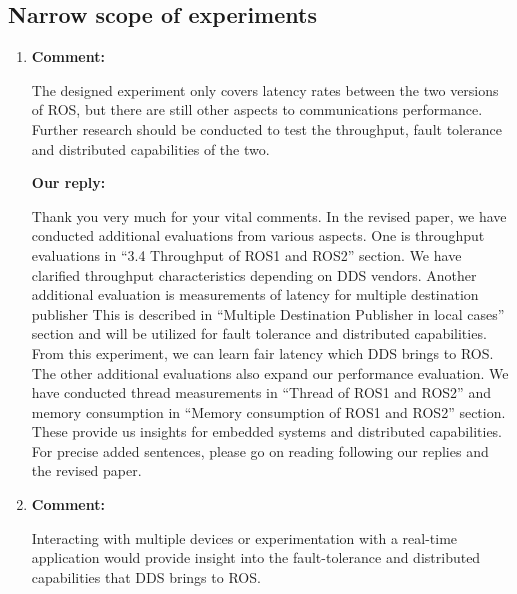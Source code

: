 \documentclass{article}
\begin{document}
\subsection{Narrow scope of experiments}
\begin{enumerate}

\item \begin{flushleft}
    \textbf{Comment:}
  \end{flushleft}
  The designed experiment only covers latency rates between the two versions of ROS, but there are still other aspects to communications performance. Further research should be conducted to test the throughput, fault tolerance and distributed capabilities of the two.
  
  \begin{flushleft}
    \textbf{Our reply:}
  \end{flushleft}
  Thank you very much for your vital comments.
  In the revised paper, we have conducted additional evaluations from various aspects.
  One is throughput evaluations in ``3.4 Throughput of ROS1 and ROS2'' section.
  We have clarified throughput characteristics depending on DDS vendors.
  Another additional evaluation is measurements of latency for multiple destination publisher
  This is described in ``Multiple Destination Publisher in local cases'' section and will be utilized for fault tolerance and distributed capabilities.
  From this experiment, we can learn fair latency which DDS brings to ROS.
  The other additional evaluations also expand our performance evaluation.
  We have conducted thread measurements in ``Thread of ROS1 and ROS2'' and memory consumption in ``Memory consumption of ROS1 and ROS2'' section.
  These provide us insights for embedded systems and distributed capabilities.
  For precise added sentences, please go on reading following our replies and the revised paper.
 
\item \begin{flushleft}
    \textbf{Comment:}
  \end{flushleft}
  Interacting with multiple devices or experimentation with a real-time application would provide insight into the fault-tolerance and distributed capabilities that DDS brings to ROS.


\end{enumerate}
\end{document}
